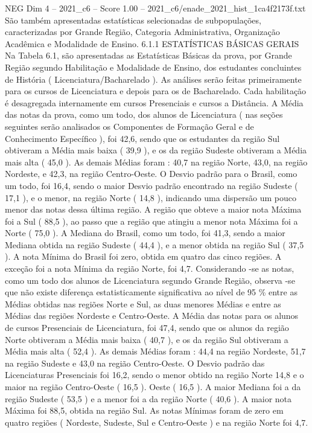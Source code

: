 \begin{textsample}{NEG Dim 4 – 2021\_c6 – Score 1.00 – 2021\_c6/enade\_2021\_hist\_1ca4f2173f.txt}
São também apresentadas estatísticas selecionadas de subpopulações, caracterizadas por Grande Região, Categoria Administrativa, Organização Acadêmica e Modalidade de Ensino. 6.1.1 ESTATÍSTICAS BÁSICAS GERAIS Na Tabela 6.1, são apresentadas as Estatísticas Básicas da prova, por Grande Região segundo Habilitação e Modalidade de Ensino, dos estudantes concluintes de História ( Licenciatura/Bacharelado ).
As análises serão feitas primeiramente para os cursos de Licenciatura e depois para os de Bacharelado.
Cada habilitação é desagregada internamente em cursos Presenciais e cursos a Distância.
A Média das notas da prova, como um todo, dos alunos de Licenciatura ( nas seções seguintes serão analisados os Componentes de Formação Geral e de Conhecimento Específico ), foi 42,6, sendo que os estudantes da região Sul obtiveram a Média mais baixa ( 39,9 ), e os da região Sudeste obtiveram a Média mais alta ( 45,0 ).
As demais Médias foram : 40,7 na região Norte, 43,0, na região Nordeste, e 42,3, na região Centro-Oeste.
O Desvio padrão para o Brasil, como um todo, foi 16,4, sendo o maior Desvio padrão encontrado na região Sudeste ( 17,1 ), e o menor, na região Norte ( 14,8 ), indicando uma dispersão um pouco menor das notas dessa última região.
A região que obteve a maior nota Máxima foi a Sul ( 88,5 ), ao passo que a região que atingiu a menor nota Máxima foi a Norte ( 75,0 ).
A Mediana do Brasil, como um todo, foi 41,3, sendo a maior Mediana obtida na região Sudeste ( 44,4 ), e a menor obtida na região Sul ( 37,5 ).
A nota Mínima do Brasil foi zero, obtida em quatro das cinco regiões.
A exceção foi a nota Mínima da região Norte, foi 4,7.
Considerando -se as notas, como um todo dos alunos de Licenciatura segundo Grande Região, observa -se que não existe diferença estatisticamente significativa ao nível de 95 \% entre as Médias obtidas nas regiões Norte e Sul, as duas menores Médias e entre as Médias das regiões Nordeste e Centro-Oeste.
A Média das notas para os alunos de cursos Presenciais de Licenciatura, foi 47,4, sendo que os alunos da região Norte obtiveram a Média mais baixa ( 40,7 ), e os da região Sul obtiveram a Média mais alta ( 52,4 ).
As demais Médias foram : 44,4 na região Nordeste, 51,7 na região Sudeste e 43,0 na região Centro-Oeste.
O Desvio padrão das Licenciaturas Presenciais foi 16,2, sendo o menor obtido na região Norte 14,8 e o maior na região Centro-Oeste ( 16,5 ).
Oeste ( 16,5 ).
A maior Mediana foi a da região Sudeste ( 53,5 ) e a menor foi a da região Norte ( 40,6 ).
A maior nota Máxima foi 88,5, obtida na região Sul.
As notas Mínimas foram de zero em quatro regiões ( Nordeste, Sudeste, Sul e Centro-Oeste ) e na região Norte foi 4,7.

\end{textsample}
